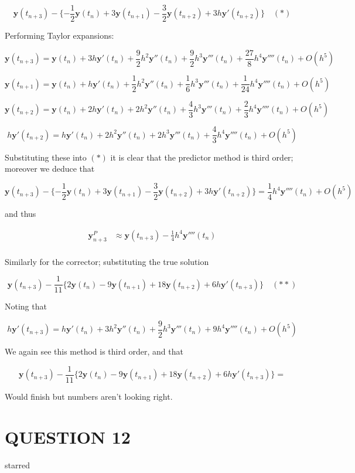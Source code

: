\documentclass[a4paper]{article}
\begin{document}
\[ \mathbf{y}(t_{n+3}) - \{  - \frac{1}{2} \mathbf{y}(t_{n}) + 3 \mathbf{y}(t_{n+1})  - \frac{3}{2} \mathbf{y}(t_{n+2}) + 3h\mathbf{y}'(t_{n+2})  \} \quad (*) \]

Performing Taylor expansions:

\[ \mathbf{y}(t_{n+3}) = \mathbf{y}(t_{n}) + 3h \mathbf{y}'(t_{n}) + \frac{9}{2} h^{2} \mathbf{y}''(t_{n}) + \frac{9}{2} h^{3}  \mathbf{y}'''(t_{n}) + \frac{27}{8} h^{4} \mathbf{y}''''(t_{n})+ O(h^{5}) \]


\[ \mathbf{y}(t_{n+1}) = \mathbf{y}(t_{n}) + h \mathbf{y}'(t_{n}) + \frac{1}{2} h^{2} \mathbf{y}''(t_{n}) + \frac{1}{6} h^{3}  \mathbf{y}'''(t_{n}) + \frac{1}{24} h^{4} \mathbf{y}''''(t_{n})+ O(h^{5}) \]



\[ \mathbf{y}(t_{n+2}) = \mathbf{y}(t_{n}) + 2h \mathbf{y}'(t_{n}) + 2 h^{2} \mathbf{y}''(t_{n}) + \frac{4}{3} h^{3}  \mathbf{y}'''(t_{n}) + \frac{2}{3} h^{4} \mathbf{y}''''(t_{n})+ O(h^{5}) \]

\[ h\mathbf{y}'(t_{n+2}) = h \mathbf{y}'(t_{n}) + 2h^{2} \mathbf{y}''(t_{n}) + 2 h^{3} \mathbf{y}'''(t_{n}) + \frac{4}{3} h^{4}  \mathbf{y}''''(t_{n}) + O(h^{5}) \]

Substituting these into $ (*) $ it is clear that the predictor method is third order; moreover we deduce that 

\[ \mathbf{y}(t_{n+3}) - \{  - \frac{1}{2} \mathbf{y}(t_{n}) + 3 \mathbf{y}(t_{n+1})  - \frac{3}{2} \mathbf{y}(t_{n+2}) + 3h\mathbf{y}'(t_{n+2})  \} =  \frac{1}{4} h^{4} \mathbf{y}''''(t_{n}) + O(h^{5})   \]

and thus

\begin{align*}
\mathbf{y}_{n+3}^{P} & \approx \mathbf{y}(t_{n+3}) - \frac{1}{4} h^{4} \mathbf{y}''''(t_{n}) \\
\end{align*}

Similarly for the corrector; substituting the true solution

\[ \mathbf{y}(t_{n+3}) - \frac{1}{11} \{ 2 \mathbf{y}(t_{n}) - 9 \mathbf{y}(t_{n+1})  + 18 \mathbf{y}(t_{n+2}) + 6h\mathbf{y}'(t_{n+3})  \} \quad (**) \]

Noting that

\[ h\mathbf{y}'(t_{n+3}) = h \mathbf{y}'(t_{n}) + 3h^{2} \mathbf{y}''(t_{n}) + \frac{9}{2} h^{3} \mathbf{y}'''(t_{n}) + 9 h^{4}  \mathbf{y}''''(t_{n}) + O(h^{5}) \]

We again see this method is third order, and that 

\[ \mathbf{y}(t_{n+3}) - \frac{1}{11} \{ 2 \mathbf{y}(t_{n}) - 9 \mathbf{y}(t_{n+1})  + 18 \mathbf{y}(t_{n+2}) + 6h\mathbf{y}'(t_{n+3})  \} =  \]

Would finish but numbers aren't looking right.




\section{QUESTION 12}

starred
\end{document}
